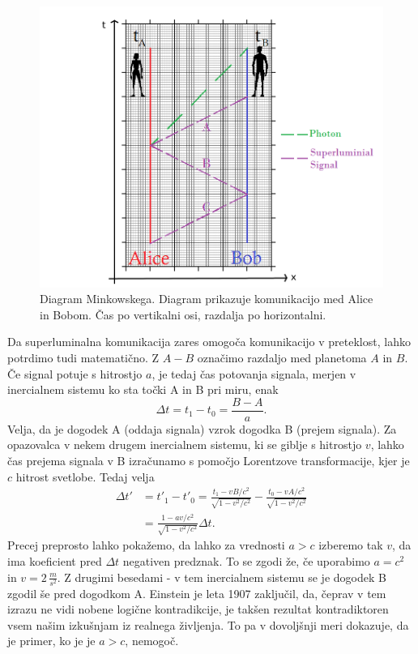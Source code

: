 \documentclass[12pt]{article}
\begin{document}
\begin{figure}[H]
\includegraphics[width=12cm]{special-relativity.png}
\centering
\caption{Diagram Minkowskega. Diagram prikazuje komunikacijo med Alice in Bobom. Čas po vertikalni osi, razdalja po horizontalni. \cite{marcocerezoEntanglementHowIt2015}}
\label{fig:minkowski}
\end{figure}

\par
Da superluminalna komunikacija zares omogoča komunikacijo v preteklost, lahko potrdimo tudi matematično. Z $A - B$ označimo razdaljo med planetoma $A$ in $B$. Če signal potuje s hitrostjo $a$, je tedaj čas potovanja signala, merjen v inercialnem sistemu ko sta točki A in B pri miru, enak 
\begin{equation} \label{eq2}
\Delta t=t_{1}-t_{0}=\frac{B-A}{a}.
\end{equation}
Velja, da je dogodek A (oddaja signala) vzrok dogodka B (prejem signala). Za opazovalca v nekem drugem inercialnem sistemu, ki se giblje s hitrostjo $v$, lahko čas prejema signala v B izračunamo s pomočjo Lorentzove transformacije, kjer je $c$ hitrost svetlobe. Tedaj velja 
\begin{equation} \label{eq3}
\begin{split}
\Delta t' & =t'_{1}-t'_{0}=\frac{t_{1}-vB/c^{2}}{\sqrt{1-v^{2}/c^{2}}}-\frac{t_{0}-vA/c^{2}}{\sqrt{1-v^{2}/c^{2}}}\\
 & =\frac{1-av/c^{2}}{\sqrt{1-v^{2}/c^{2}}}\Delta t.
\end{split}
\end{equation}
Precej preprosto lahko pokažemo, da lahko za vrednosti $a > c$ izberemo tak $v$, da ima koeficient pred $\Delta t$ negativen predznak. To se zgodi že, če uporabimo $a = c^2$ in $v = 2 \, \frac{m}{s^2}$. Z drugimi besedami - v tem inercialnem sistemu se je dogodek B zgodil še pred dogodkom A. Einstein je leta 1907 zaključil, da, čeprav v tem izrazu ne vidi nobene logične kontradikcije, je takšen rezultat kontradiktoren vsem našim izkušnjam iz realnega življenja. To pa v dovoljšnji meri dokazuje, da je primer, ko je je $a > c$, nemogoč. \cite{TachyonicAntitelephone2022a}
\end{document}
